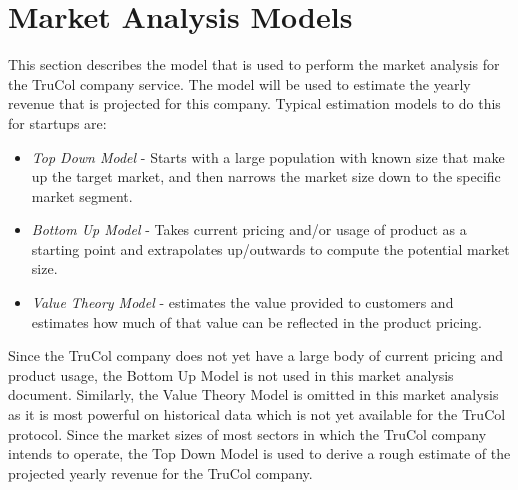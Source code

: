 \section{Market Analysis Models}\label{sec:market_analysis_model}
This section describes the model that is used to perform the market analysis for the TruCol company service. The model will be used to estimate the yearly revenue that is projected for this company. Typical estimation models to do this for startups are:
\begin{itemize}
	\item \textit{Top Down Model} - Starts with a large population with known size that make up the target market, and then narrows the market size down to the specific market segment.
	\item \textit{Bottom Up Model} - Takes current pricing and/or usage of product as a starting point and extrapolates up/outwards to compute the potential market size.
	\item \textit{Value Theory Model} - estimates the value provided to customers and estimates how much of that value can be reflected in the product pricing.
\end{itemize}

\noindent Since the TruCol company does not yet have a large body of current pricing and product usage, the Bottom Up Model is not used in this market analysis document. Similarly, the Value Theory Model is omitted in this market analysis as it is most powerful on historical data which is not yet available for the TruCol protocol. Since the market sizes of most sectors in which the TruCol company intends to operate, the Top Down Model is used to derive a rough estimate of the projected yearly revenue for the TruCol company.
